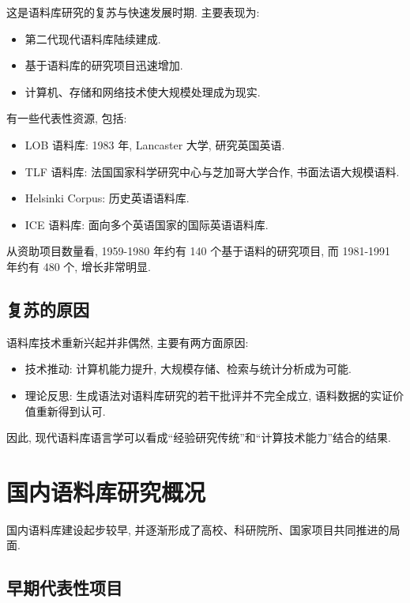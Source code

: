 这是语料库研究的复苏与快速发展时期. 主要表现为:

\begin{itemize}
\item 第二代现代语料库陆续建成.
\item 基于语料库的研究项目迅速增加.
\item 计算机、存储和网络技术使大规模处理成为现实.
\end{itemize}

有一些代表性资源, 包括:

\begin{itemize}
\item LOB 语料库: 1983 年, Lancaster 大学, 研究英国英语.
\item TLF 语料库: 法国国家科学研究中心与芝加哥大学合作, 书面法语大规模语料.
\item Helsinki Corpus: 历史英语语料库.
\item ICE 语料库: 面向多个英语国家的国际英语语料库.
\end{itemize}

从资助项目数量看, 1959-1980 年约有 140 个基于语料的研究项目,
而 1981-1991 年约有 480 个, 增长非常明显.

\subsection{复苏的原因}


语料库技术重新兴起并非偶然, 主要有两方面原因:

\begin{itemize}
\item 技术推动: 计算机能力提升, 大规模存储、检索与统计分析成为可能.
\item 理论反思: 生成语法对语料库研究的若干批评并不完全成立, 语料数据的实证价值重新得到认可.
\end{itemize}

因此, 现代语料库语言学可以看成“经验研究传统”和“计算技术能力”结合的结果.

\section{国内语料库研究概况}


国内语料库建设起步较早, 并逐渐形成了高校、科研院所、国家项目共同推进的局面.

\subsection{早期代表性项目}


